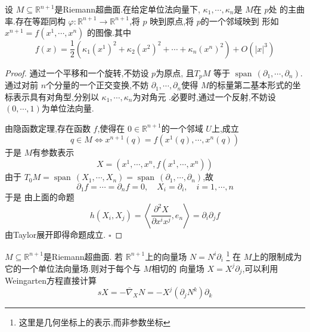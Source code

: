 \documentclass[../../几何与拓扑.tex]{subfiles}
\begin{document}
\begin{proposition}
    设 \(  M\subseteq \mathbb{R} ^{n+ 1}  \)是Riemann超曲面.在给定单位法向量下,  \(   \kappa_1,\cdots,\kappa_n   \)是 \(  M  \)在 \(  p  \)处 的主曲率.存在等距同构 \(   \varphi :\mathbb{R} ^{n+ 1}\to \mathbb{R} ^{n+ 1}  \),将 \(  p  \)     映到原点,将 \(  p  \)的一个邻域映到 形如 \(  x^{n+ 1}= f\left(  x^1,\cdots,x^n  \right)   \)  的图像.其中 \[
    f\left( x \right)= \frac{1 }{2 }\left( { \kappa _1 \left(x^{1}  \right)^{2} }+  \kappa _2 \left( x^{2} \right)^{2}+ \cdots +  \kappa _{n}\left( x^{n} \right)^{2}    \right)+  O\left( \left| x \right|^{3}  \right)    
    \]
\end{proposition}
\begin{proof}
    通过一个平移和一个旋转,不妨设 \(  p  \)为原点, 且\(  T_{p}M  \)  等于 \(  \operatorname{span}\,\left(  \partial _{1},\cdots , \partial _{n} \right)   \).通过对前 \(  n  \)个分量的一个正交变换,不妨 \(   \partial_1,\cdots,\partial_n   \)使得 \(  M  \)的标量第二基本形式的坐标表示具有对角型,分别以 \(   \kappa_1,\cdots,\kappa_n   \)为对角元    .必要时,通过一个反射,不妨设 \(  \left( 0,\cdots ,1 \right)   \)为单位法向量.
    
    由隐函数定理,存在函数 \(  f  \),使得在 \(  0 \in \mathbb{R} ^{n+ 1}  \)的一个邻域 \(  U  \)上,成立 \[
    q\in M \iff x^{n+ 1}\left( q \right)= f\left( x^{1}\left( q \right),\cdots ,x^{n}\left( q \right)   \right)  
    \]   于是 \(  M  \)有参数表示 \[
   X=  \left( x^{1},\cdots ,x^{n},f\left( x^{1},\cdots ,x^{n} \right)  \right) 
    \] 由于 \(  T_0M=  \operatorname{span}\,\left( X_1,\cdots ,X_{n} \right)= \operatorname{span}\,\left(  \partial _{1},\cdots , \partial _{n} \right)    \),故 \[
     \partial _{1}f= \cdots =  \partial _{n}f= 0,\quad X_{i}=  \partial _{i},\quad i= 1,\cdots ,n
    \] 于是 由上面的命题\[
    h\left( X_{i},X_{j} \right) =  \left<\frac{\partial ^{2}X}{\partial x^{i}x^{j}} , e_{n}\right>=  \partial _{i} \partial _{j}f
    \]由Taylor展开即得命题成立.
    \hfill $\square$
\end{proof}

\begin{proposition}
     \(  M\subseteq \mathbb{R} ^{n+ 1}  \)是Riemann超曲面. 若 \(  \mathbb{R} ^{n+ 1}  \)上的向量场 \(  N =  N^{i} \partial _{i}  \) \footnote{这里是几何坐标上的表示,而非参数坐标} 在 \(  M  \)上的限制成为它的一个单位法向量场.则对于每个与 \(  M  \)相切的  向量场 \(  X = X^{j} \partial _{j}  \),可以利用Weingarten方程直接计算 \[
     sX = - \overline{ \nabla }_{X}N  = - X^{j} \left(  \partial _{j}N^{k} \right) \partial _{k} 
     \] 
\end{proposition}
\end{document}
